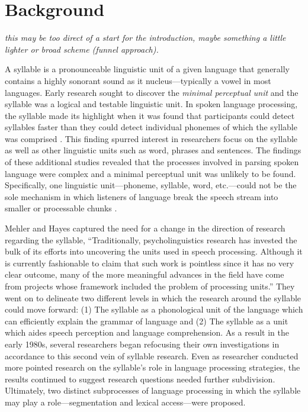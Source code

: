 \section{Background}
\emph{this may be too direct of a start for the introduction, maybe something a little lighter or broad scheme (funnel approach).}

A syllable is a pronounceable linguistic unit of a given language that generally contains a highly sonorant sound as it nucleus—typically a vowel in most languages. Early research sought to discover the \emph{minimal perceptual unit} and the syllable was a logical and testable linguistic unit. In spoken language processing, the syllable made its highlight when it was found that participants could detect syllables faster than they could detect individual phonemes of which the syllable was comprised \citep*{Savin1970-oy}. This finding spurred interest in researchers focus on the syllable as well as other linguistic units such as word, phrases and sentences. The findings of these additional studies revealed that the processes involved in parsing spoken language were complex and a minimal perceptual unit was unlikely to be found. %
Specifically, one linguistic unit—phoneme, syllable, word, etc.—could not be the sole mechanism in which listeners of language break the speech stream into smaller or processable chunks \citep{Foss1973-ll,Healy1976-js,McNeill1973-bo}. 

Mehler and Hayes \parencite*{Mehler1981-wp} captured the need for a change in the direction of research regarding the syllable, “Traditionally, psycholinguistics research has invested the bulk of its efforts into uncovering the units used in speech processing. Although it is currently fashionable to claim that such work is pointless since it has no very clear outcome, many of the more meaningful advances in the field have come from projects whose framework included the problem of processing units.” They went on to delineate two different levels in which the research around the syllable could move forward: (1) The syllable as a phonological unit of the language which can efficiently explain the grammar of language and (2) The syllable as a unit which aides speech perception and language comprehension. As a result in the early 1980s, several researchers began refocusing their own investigations in accordance to this second vein of syllable research. %
Even as researcher conducted more pointed research on the syllable's role in language processing strategies, the results continued to suggest research questions needed further subdivision. Ultimately, two distinct subprocesses of language processing in which the syllable may play a role---segmentation and lexical access---were proposed. 


